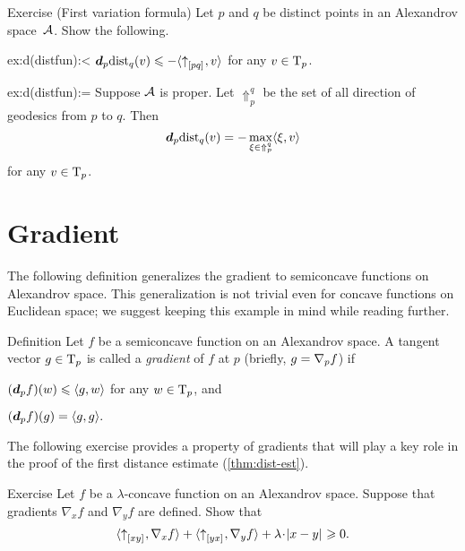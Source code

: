 \begin{thm}{Exercise (First variation formula)} \label{ex:d(distfun)}
Let $p$ and $q$ be distinct points in an Alexandrov space~$\mathcal{A}$.
Show the following.

\begin{subthm}{ex:d(distfun):<}
$\bm{d}_p\mathrm{dist}_q(v)\leqslant -\langle{\uparrow}_{[{p}{q}]_{{}}},v\rangle$
for any $v\in\mathrm{T}_p$.
\end{subthm}

\begin{subthm}{ex:d(distfun):=}
Suppose $\mathcal{A}$ is proper.
Let $\Uparrow_p^q$ be the set of all direction of  geodesics from $p$ to $q$.
Then
\[\bm{d}_p\mathrm{dist}_q(v)=-\max_{\xi\in\Uparrow_p^q}\langle\xi,v\rangle\]
for any $v\in\mathrm{T}_p$.
\end{subthm}

\end{thm}

\section{Gradient}\label{sec:grad-def}

The following definition generalizes the gradient to semiconcave functions on Alexandrov space.
This generalization is not trivial even for concave functions on Euclidean space;
we suggest keeping this example in mind while reading further.

\begin{thm}{Definition}\label{def:grad} 
Let $f$ be a semiconcave function on an Alexandrov space.
A tangent vector $g\in \mathrm{T}_p$ is called a 
\emph{gradient} of $f$ at $p$ 
(briefly,  $g=\nabla_p f$) if
\begin{subthm}{}
$(\bm{d}_p f)(w)\leqslant \langle g,w\rangle$ for any $w\in \mathrm{T}_p$, and
\end{subthm}

\begin{subthm}{}
$(\bm{d}_p f)(g) = \langle g,g\rangle.$
\end{subthm}
\end{thm}

The following exercise provides a property of gradients that will play a key role in the proof of the first distance estimate (\ref{thm:dist-est}).

\begin{thm}{Exercise}\label{ex:monotonicity}
Let $f$ be a $\lambda$-concave function on an Alexandrov space.
Suppose that gradients $\nabla_xf$ and $\nabla_yf$ are defined.
Show that 
\[\<\dir{x}{y},\nabla_{x}f\>
+
\<\dir{y}{x},\nabla_{y}f\>
+
\lambda\cdot\dist{x}{y}{}\ge 0.\]
\end{thm}

